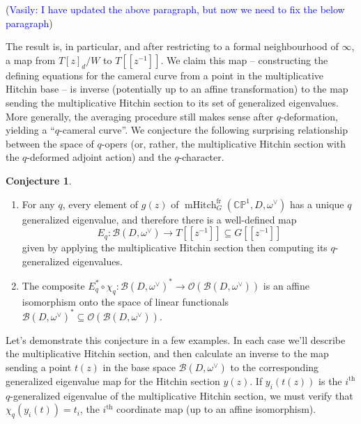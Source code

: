 \documentclass[11pt, oneside, reqno]{amsart}
\theoremstyle{definition} \newtheorem{definition}{Definition}[section]
\newtheorem{conjecture}[definition]{Conjecture}
\theoremstyle{definition} \newtheorem{remark}[definition]{Remark}
\theoremstyle{definition} \newtheorem{remarks}[definition]{Remarks}
\theoremstyle{definition} \newtheorem{question}[definition]{Question}
\theoremstyle{definition} \newtheorem*{note}{Note}
\theoremstyle{definition} \newtheorem{example}[definition]{Example}
\theoremstyle{definition} \newtheorem{examples}[definition]{Examples}
\newcommand{\bb}[1]{\mathbb{#1}}
\newcommand{\mc}[1]{\mathcal{#1}}
\newcommand{\OO}{\mathcal{O}}
\newcommand{\sub}{\subseteq}
\DeclareMathOperator{\mhitch}{mHitch}
\newcommand{\fr}{\mathrm{fr}}
\newcommand{\vasily}[1]{(\textcolor{blue}{Vasily: #1})}
\begin{document}
\vasily{I have updated the above paragraph, but now we need to fix the below paragraph}


The result is, in particular, and after restricting to a formal neighbourhood of $\infty$, a map from $T[z]_d/W$ to $T[[z^{-1}]]$.  We claim this map -- constructing the defining equations for the cameral curve from a point in the multiplicative Hitchin base -- is inverse (potentially up to an affine transformation) to the map sending the multiplicative Hitchin section to its set of generalized eigenvalues.  More generally, the averaging procedure still makes sense after $q$-deformation, yielding a ``$q$-cameral curve''.  We conjecture the following surprising relationship between the space of $q$-opers (or, rather, the multiplicative Hitchin section with the $q$-deformed adjoint action) and the $q$-character.
 
\begin{conjecture} \label{qchar_conjecture}
\begin{enumerate}
\item For any $q$, every element of $g(z)$ of $\mhitch^\fr_G(\bb{CP}^1, D, \omega^\vee)$ has a unique $q$ generalized eigenvalue, and therefore there is a well-defined map
\[E_q \colon \mc B(D,\omega^\vee) \to T[[z^{-1}]] \sub G[[z^{-1}]]\]
given by applying the multiplicative Hitchin section then computing its $q$-generalized eigenvalues.  

\item The composite $E_q^* \circ \chi_q \colon \mc B(D,\omega^\vee)^* \to \OO(\mc B(D,\omega^\vee))$ is an affine isomorphism onto the space of linear functionals $\mc B(D,\omega^\vee)^* \sub \OO(\mc B(D,\omega^\vee))$.
\end{enumerate}
\end{conjecture}

Let's demonstrate this conjecture in a few examples.  In each case we'll describe the multiplicative Hitchin section, and then calculate an inverse to the map sending a point $t(z)$ in the base space $\mc B(D,\omega^\vee)$ to the corresponding generalized eigenvalue map for the Hitchin section $y(z)$.  If $y_i(t(z))$ is the $i^\text{th}$ $q$-generalized eigenvalue of the multiplicative Hitchin section, we must verify that $\chi_q(y_i(t)) = t_i$, the $i^\text{th}$ coordinate map (up to an affine isomorphism).
\end{document}
